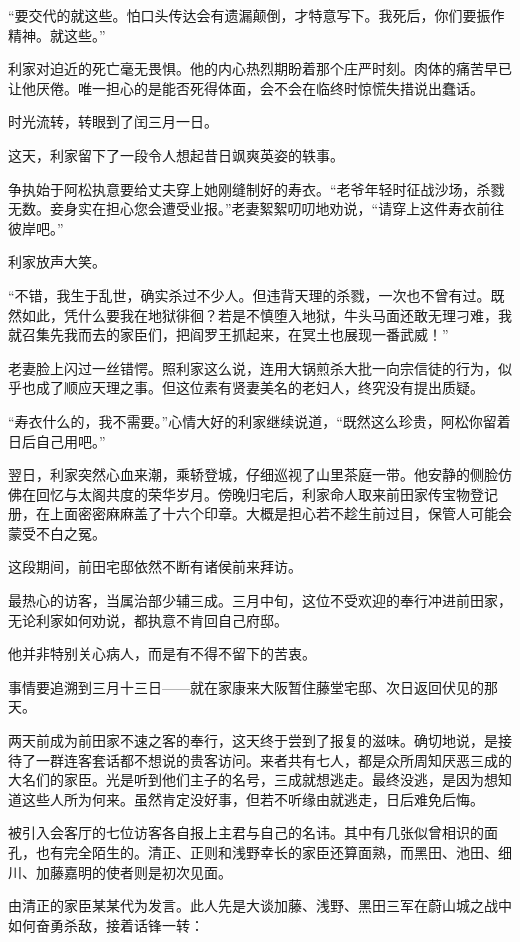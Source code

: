 \documentclass[
]{book}
\begin{document}
``要交代的就这些。怕口头传达会有遗漏颠倒，才特意写下。我死后，你们要振作精神。就这些。''

利家对迫近的死亡毫无畏惧。他的内心热烈期盼着那个庄严时刻。肉体的痛苦早已让他厌倦。唯一担心的是能否死得体面，会不会在临终时惊慌失措说出蠢话。

时光流转，转眼到了闰三月一日。

这天，利家留下了一段令人想起昔日飒爽英姿的轶事。

争执始于阿松执意要给丈夫穿上她刚缝制好的寿衣。``老爷年轻时征战沙场，杀戮无数。妾身实在担心您会遭受业报。''老妻絮絮叨叨地劝说，``请穿上这件寿衣前往彼岸吧。''

利家放声大笑。

``不错，我生于乱世，确实杀过不少人。但违背天理的杀戮，一次也不曾有过。既然如此，凭什么要我在地狱徘徊？若是不慎堕入地狱，牛头马面还敢无理刁难，我就召集先我而去的家臣们，把阎罗王抓起来，在冥土也展现一番武威！''

老妻脸上闪过一丝错愕。照利家这么说，连用大锅煎杀大批一向宗信徒的行为，似乎也成了顺应天理之事。但这位素有贤妻美名的老妇人，终究没有提出质疑。

``寿衣什么的，我不需要。''心情大好的利家继续说道，``既然这么珍贵，阿松你留着日后自己用吧。''

翌日，利家突然心血来潮，乘轿登城，仔细巡视了山里茶庭一带。他安静的侧脸仿佛在回忆与太阁共度的荣华岁月。傍晚归宅后，利家命人取来前田家传宝物登记册，在上面密密麻麻盖了十六个印章。大概是担心若不趁生前过目，保管人可能会蒙受不白之冤。

这段期间，前田宅邸依然不断有诸侯前来拜访。

最热心的访客，当属治部少辅三成。三月中旬，这位不受欢迎的奉行冲进前田家，无论利家如何劝说，都执意不肯回自己府邸。

他并非特别关心病人，而是有不得不留下的苦衷。

事情要追溯到三月十三日------就在家康来大阪暂住藤堂宅邸、次日返回伏见的那天。

两天前成为前田家不速之客的奉行，这天终于尝到了报复的滋味。确切地说，是接待了一群连客套话都不想说的贵客访问。来者共有七人，都是众所周知厌恶三成的大名们的家臣。光是听到他们主子的名号，三成就想逃走。最终没逃，是因为想知道这些人所为何来。虽然肯定没好事，但若不听缘由就逃走，日后难免后悔。

被引入会客厅的七位访客各自报上主君与自己的名讳。其中有几张似曾相识的面孔，也有完全陌生的。清正、正则和浅野幸长的家臣还算面熟，而黑田、池田、细川、加藤嘉明的使者则是初次见面。

由清正的家臣某某代为发言。此人先是大谈加藤、浅野、黑田三军在蔚山城之战中如何奋勇杀敌，接着话锋一转：
\end{document}
